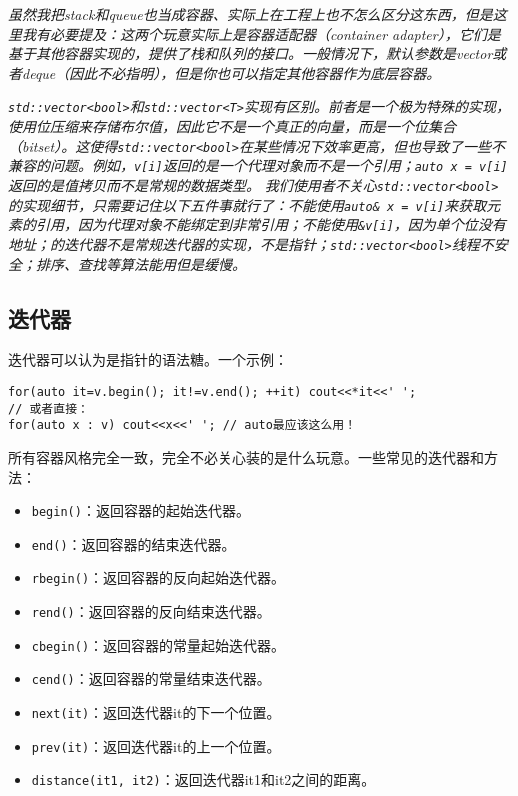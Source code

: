 \documentclass[../main.tex]{subfiles}
\begin{document}
\emph{
  虽然我把stack和queue也当成容器、实际上在工程上也不怎么区分这东西，但是这里我有必要提及：这两个玩意实际上是容器适配器（container adapter），它们是基于其他容器实现的，提供了栈和队列的接口。一般情况下，默认参数是vector或者deque（因此不必指明），但是你也可以指定其他容器作为底层容器。
}

\emph{
  \texttt{std::vector<bool>}和\texttt{std::vector<T>}实现有区别。前者是一个极为特殊的实现，使用位压缩来存储布尔值，因此它不是一个真正的向量，而是一个位集合（bitset）。这使得\texttt{std::vector<bool>}在某些情况下效率更高，但也导致了一些不兼容的问题。例如，\texttt{v[i]}返回的是一个代理对象而不是一个引用；\texttt{auto x = v[i]}返回的是值拷贝而不是常规的数据类型。
}
\emph{
  我们使用者不关心\texttt{std::vector<bool>}的实现细节，只需要记住以下五件事就行了：不能使用\texttt{auto\& x = v[i]}来获取元素的引用，因为代理对象不能绑定到非常引用；不能使用\texttt{\&v[i]}，因为单个位没有地址；的迭代器不是常规迭代器的实现，不是指针；\texttt{std::vector<bool>}线程不安全；排序、查找等算法能用但是缓慢。
}

\subsection{迭代器}

迭代器可以认为是指针的语法糖。一个示例：
\begin{lstlisting}
for(auto it=v.begin(); it!=v.end(); ++it) cout<<*it<<' ';
// 或者直接：
for(auto x : v) cout<<x<<' '; // auto最应该这么用！
\end{lstlisting}

所有容器风格完全一致，完全不必关心装的是什么玩意。一些常见的迭代器和方法：
\begin{itemize}
  \item \texttt{begin()}：返回容器的起始迭代器。
  \item \texttt{end()}：返回容器的结束迭代器。
  \item \texttt{rbegin()}：返回容器的反向起始迭代器。
  \item \texttt{rend()}：返回容器的反向结束迭代器。
  \item \texttt{cbegin()}：返回容器的常量起始迭代器。
  \item \texttt{cend()}：返回容器的常量结束迭代器。
  \item \texttt{next(it)}：返回迭代器it的下一个位置。
  \item \texttt{prev(it)}：返回迭代器it的上一个位置。
  \item \texttt{distance(it1, it2)}：返回迭代器it1和it2之间的距离。
\end{itemize}
\end{document}
